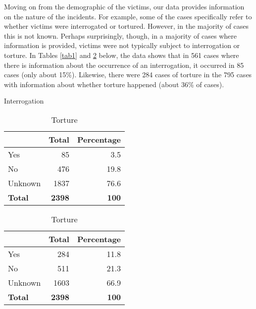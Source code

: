 \documentclass[a4paper,12pt]{article}
\begin{document}
Moving on from the demographic of the victims, our data provides information on the nature of the incidents. For example, some of the cases specifically refer to whether victims were interrogated or tortured. However, in the majority of cases this is not known. Perhaps surprisingly, though, in a majority of cases where information is provided, victims were not typically subject to interrogation or torture. In Tables \ref{tab1} and \ref{tab2} below, the data shows that in 561 cases where there is information about the occurrence of an interrogation, it occurred in 85 cases (only about 15\%). Likewise, there were 284 cases of torture in the 795 cases with information about whether torture happened (about 36\% of cases).

\begin{center}
  \begin{table}[H]
  		\begin{minipage}{.5\textwidth}
  		        \centering
			\caption{Interrogation\label{tab1}}
			\begin{tabular}{l r r}
				\toprule       & Total         & Percentage   \\
				\midrule Yes   & 85            & 3.5          \\
				No             & 476           & 19.8         \\
				Unknown        & 1837          & 76.6         \\
				\textbf{Total} & \textbf{2398} & \textbf{100} \\
				\bottomrule
			\end{tabular}
		\end{minipage}
		\begin{minipage}{.5\textwidth}
			\centering
			\caption{Torture\label{tab2}}
			\begin{tabular}{l r r}
				\toprule       & Total         & Percentage   \\
				\midrule Yes   & 284           & 11.8         \\
				No             & 511           & 21.3         \\
				Unknown        & 1603          & 66.9         \\
				\textbf{Total} & \textbf{2398} & \textbf{100} \\
				\bottomrule
			\end{tabular}
		\end{minipage}
	\end{table}
\end{center}
\end{document}
